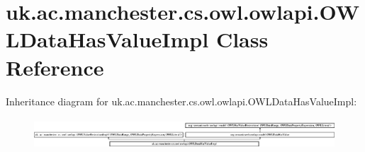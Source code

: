 \hypertarget{classuk_1_1ac_1_1manchester_1_1cs_1_1owl_1_1owlapi_1_1_o_w_l_data_has_value_impl}{\section{uk.\-ac.\-manchester.\-cs.\-owl.\-owlapi.\-O\-W\-L\-Data\-Has\-Value\-Impl Class Reference}
\label{classuk_1_1ac_1_1manchester_1_1cs_1_1owl_1_1owlapi_1_1_o_w_l_data_has_value_impl}
}
Inheritance diagram for uk.\-ac.\-manchester.\-cs.\-owl.\-owlapi.\-O\-W\-L\-Data\-Has\-Value\-Impl\-:\begin{figure}[H]
\begin{center}
\leavevmode
\includegraphics[height=1.169916cm]{classuk_1_1ac_1_1manchester_1_1cs_1_1owl_1_1owlapi_1_1_o_w_l_data_has_value_impl}
\end{center}
\end{figure}

